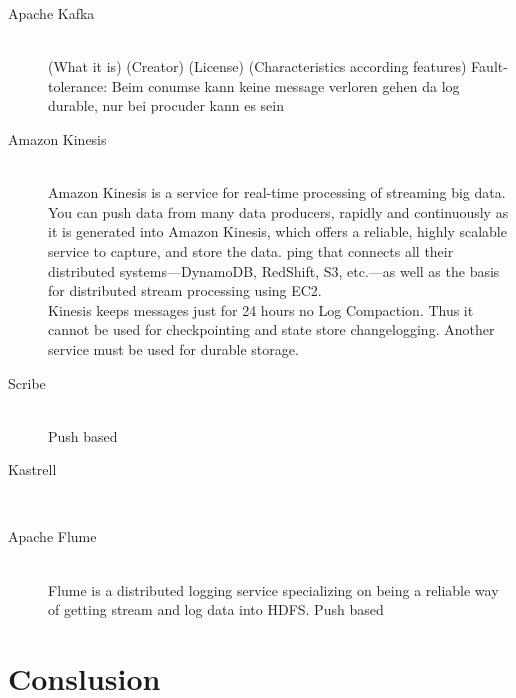 \begin{description}
    \item [Apache Kafka] \hfill \\
        { (What it is) (Creator) (License) (Characteristics according features) Fault-tolerance: Beim conumse kann keine message verloren gehen da log durable, nur bei procuder kann es sein }
    \item [Amazon Kinesis] \hfill \\
    { Amazon Kinesis is a service for real-time processing of streaming big
    data. You can push data from many data producers, rapidly and continuously
as it is generated into Amazon Kinesis, which offers a reliable, highly
scalable service to capture, and store the data. ping that connects all their
distributed systems—DynamoDB, RedShift, S3, etc.—as well as the basis for
distributed stream processing using EC2. \\
 Kinesis keeps messages just for 24 hours no Log Compaction. Thus it cannot be
 used for checkpointing and state store changelogging. Another service must be
 used for durable storage.\\
    
 }
    \item [Scribe] \hfill \\
    { Push based}
    \item [Kastrell] \hfill \\
    {}
    \item [Apache Flume] \hfill \\
    {Flume is a distributed logging service specializing on being a reliable way
    of getting stream and log data into HDFS. Push based}
\end{description}

\section{Conslusion}

